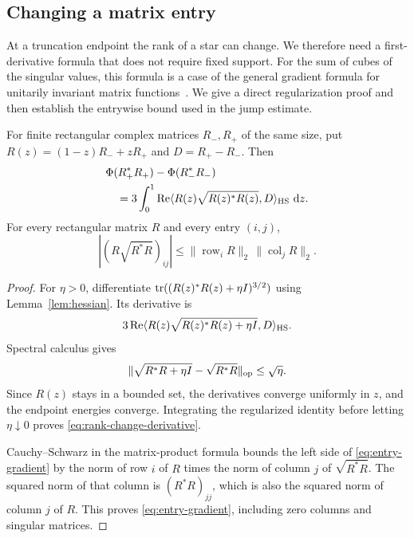 \subsection{Changing a matrix entry}

At a truncation endpoint the rank of a star can change.  We therefore
need a first-derivative formula that does not require fixed support.
For the sum of cubes of the singular values, this formula is a case
of the general gradient formula for unitarily invariant matrix
functions~\cite[Theorem~3.1]{Lewis1995}. We give a direct regularization
proof and then establish the entrywise bound used in the jump estimate.

\begin{lemma}\label{lem:rank-change}
For finite rectangular complex matrices $R_-,R_+$ of the same size,
put $R(z)=(1-z)R_-+zR_+$ and $D=R_+-R_-$.  Then
\begin{equation}\label{eq:rank-change-derivative}
 \begin{aligned}
 &\Phi(R_+^*R_+)-\Phi(R_-^*R_-)\\
 &\quad=3\int_0^1\operatorname{Re}
   \langle R(z)\sqrt{R(z)^*R(z)},D\rangle_{\mathrm{HS}}\,\mathop{}\!\mathrm d z.
 \end{aligned}
\end{equation}
For every rectangular matrix $R$ and every entry $(i,j)$,
\begin{equation}\label{eq:entry-gradient}
 |(R\sqrt{R^*R})_{ij}|
 \le\|\operatorname{row}_iR\|_2\,
       \|\operatorname{col}_jR\|_2.
\end{equation}
\end{lemma}

\begin{proof}
For $\eta>0$, differentiate
$\operatorname{tr}((R(z)^*R(z)+\eta I)^{3/2})$ using
Lemma~\ref{lem:hessian}.  Its derivative is
\[
 3\operatorname{Re}
 \langle R(z)\sqrt{R(z)^*R(z)+\eta I},D\rangle_{\mathrm{HS}}.
\]
Spectral calculus gives
\[
 \|\sqrt{R^*R+\eta I}-\sqrt{R^*R}\|_{\mathrm{op}}\le\sqrt\eta.
\]
Since $R(z)$ stays in a bounded set, the derivatives converge uniformly
in $z$, and the endpoint energies converge.  Integrating the
regularized identity before letting $\eta\downarrow0$ proves
\eqref{eq:rank-change-derivative}.

Cauchy--Schwarz in the matrix-product formula bounds the left side of
\eqref{eq:entry-gradient} by the norm of row $i$ of $R$ times the norm
of column $j$ of $\sqrt{R^*R}$.  The squared norm of that column is
$(R^*R)_{jj}$, which is also the squared norm of column $j$ of $R$.
This proves \eqref{eq:entry-gradient}, including zero columns and
singular matrices.
\end{proof}

